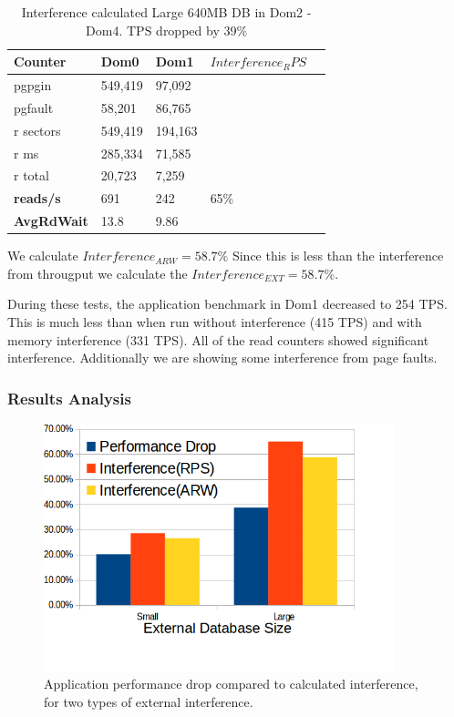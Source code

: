 \begin{table}[h]
\begin{tabular}{ l l l l p{5cm} }
  Counter     & Dom0    & Dom1    & $Interference_RPS$ \\
  \hline
	pgpgin    & 549,419 & 97,092 &  \\
	pgfault   &  58,201 & 86,765 &  \\
	r sectors & 549,419 &194,163 &  \\
	r ms      & 285,334 & 71,585 &  \\
	r total   &  20,723 &  7,259 &  \\
    \textbf{reads/s}    & 691 & 242 &   65\% \\
    \textbf{AvgRdWait}  & 13.8 & 9.86 &  \\ 
  \hline
\end{tabular}
\caption{Interference calculated Large 640MB DB in Dom2 - Dom4.  TPS dropped by 39\%}
\label{fig:InterferenceLg}
\end{table}
We calculate $Interference_{ARW} = 58.7\%$  Since this is less than the interference from througput we calculate the $Interference_{EXT} = 58.7\%$.

During these tests, the application benchmark in Dom1 decreased to 254 TPS.  This is much less than when run without interference (415 TPS) and with memory interference (331 TPS).  All of the read counters showed significant interference.  Additionally we are showing some interference from page faults.  

\subsubsection{Results Analysis}

\begin{figure}[!h]
  \begin{center}
  \includegraphics[width=4in]{images/IBM_PerfDrop_Int.png}
  \caption{Application performance drop compared to calculated interference, for two types of external interference.}
  \label{fig:perfDrop}
  \end{center}
\end{figure}

